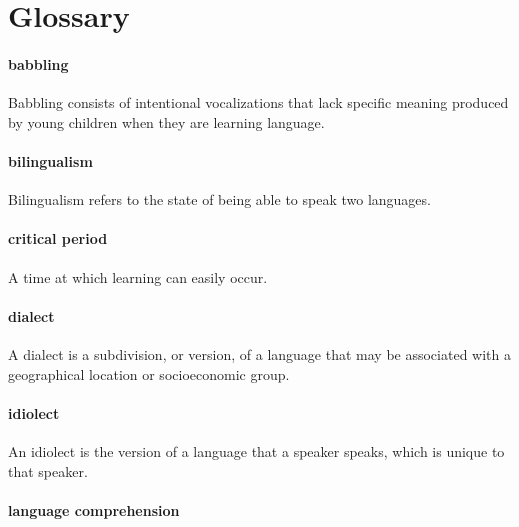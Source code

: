 \documentclass[
]{krantz}
\begin{document}
\hypertarget{glossary-7}{%
\section{Glossary}\label{glossary-7}}

\hypertarget{babbling}{%
\paragraph*{babbling}\label{babbling}}

Babbling consists of intentional vocalizations that lack specific meaning produced by young children when they are learning language.

\hypertarget{bilingualism-1}{%
\paragraph*{bilingualism}\label{bilingualism-1}}

Bilingualism refers to the state of being able to speak two languages.

\hypertarget{critical-period}{%
\paragraph*{critical period}\label{critical-period}}

A time at which learning can easily occur.

\hypertarget{dialect}{%
\paragraph*{dialect}\label{dialect}}

A dialect is a subdivision, or version, of a language that may be associated with a geographical location or socioeconomic group.

\hypertarget{idiolect}{%
\paragraph*{idiolect}\label{idiolect}}

An idiolect is the version of a language that a speaker speaks, which is unique to that speaker.

\hypertarget{language-comprehension}{%
\paragraph*{language comprehension}\label{language-comprehension}}
\end{document}

